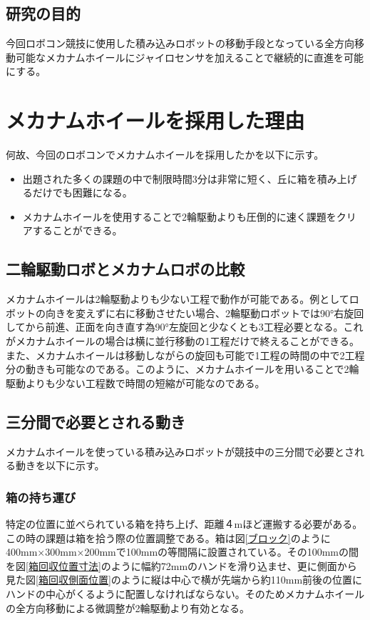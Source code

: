 \documentclass[12pt,oneside]{sotsuken_paper}
\begin{document}
	\section{研究の目的}
	今回ロボコン競技に使用した積み込みロボットの移動手段となっている全方向移動可能なメカナムホイールにジャイロセンサを加えることで継続的に直進を可能にする。

\chapter{メカナムホイールを採用した理由}
何故、今回のロボコンでメカナムホイールを採用したかを以下に示す。

\begin{itemize}
	\item 出題された多くの課題の中で制限時間3分は非常に短く、丘に箱を積み上げるだけでも困難になる。
	\item メカナムホイールを使用することで2輪駆動よりも圧倒的に速く課題をクリアすることができる。
\end{itemize}

	\section{二輪駆動ロボとメカナムロボの比較}
	メカナムホイールは2輪駆動よりも少ない工程で動作が可能である。例としてロボットの向きを変えずに右に移動させたい場合、2輪駆動ロボットでは90°右旋回してから前進、正面を向き直す為90°左旋回と少なくとも3工程必要となる。これがメカナムホイールの場合は横に並行移動の1工程だけで終えることができる。また、メカナムホイールは移動しながらの旋回も可能で1工程の時間の中で2工程分の動きも可能なのである。このように、メカナムホイールを用いることで2輪駆動よりも少ない工程数で時間の短縮が可能なのである。

	\section{三分間で必要とされる動き}
	メカナムホイールを使っている積み込みロボットが競技中の三分間で必要とされる動きを以下に示す。

		\subsection{箱の持ち運び}
		特定の位置に並べられている箱を持ち上げ、距離４mほど運搬する必要がある。この時の課題は箱を拾う際の位置調整である。箱は図\ref{ブロック}のように400mm×300mm×200mmで100mmの等間隔に設置されている。その100mmの間を図\ref{箱回収位置寸法}のように幅約72mmのハンドを滑り込ませ、更に側面から見た図\ref{箱回収側面位置}のように縦は中心で横が先端から約110mm前後の位置にハンドの中心がくるように配置しなければならない。そのためメカナムホイールの全方向移動による微調整が2輪駆動より有効となる。
\end{document}
